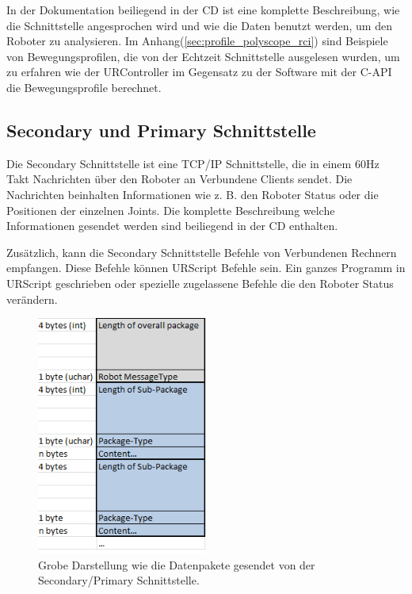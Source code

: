 In der Dokumentation beiliegend in der CD ist eine komplette Beschreibung, wie die Schnittstelle angesprochen wird und wie die Daten benutzt werden, um den Roboter zu analysieren. Im Anhang(\ref{sec:profile_polyscope_rci}) sind Beispiele von Bewegungsprofilen, die von der Echtzeit Schnittstelle ausgelesen wurden, um zu erfahren wie der URController im Gegensatz zu der Software mit der C-\ac{API} die Bewegungsprofile berechnet.

\subsection{Secondary und Primary Schnittstelle}
\label{urcontrol_spi_gru}

Die Secondary Schnittstelle ist eine \acs{TCP/IP} Schnittstelle, die in einem 60Hz Takt Nachrichten über den Roboter an Verbundene Clients sendet.
Die Nachrichten beinhalten Informationen wie z. B. den Roboter Status oder die Positionen der einzelnen Joints.
Die komplette Beschreibung welche Informationen gesendet werden sind beiliegend in der CD enthalten.

Zusätzlich, kann die Secondary Schnittstelle Befehle von Verbundenen Rechnern empfangen.
Diese Befehle können URScript Befehle sein. Ein ganzes Programm in URScript geschrieben oder spezielle zugelassene Befehle die den Roboter Status verändern.

\begin{figure}[H]
  \centering
    \includegraphics[width=0.5\textwidth]{pic/secondary_datapackage_scheme.png}
      \caption[Schema des Datenpakets gesendet von der Secondary Schnittstelle]{Grobe Darstellung wie die Datenpakete gesendet von der Secondary/Primary Schnittstelle.}
      \label{fig:datascheme_of_secondary_interface}
\end{figure}

